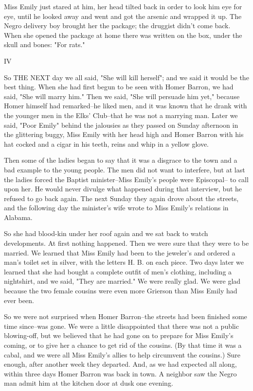 \documentclass[10pt,a4paper]{article}
\begin{document}
Miss Emily just stared at him, her head tilted back in order to look him eye for eye, until he looked away and went and got the arsenic and wrapped it up. The Negro delivery boy brought her the package; the druggist didn't come back. When she opened the package at home there was written on the box, under the skull and bones: "For rats."

IV

So THE NEXT day we all said, "She will kill herself"; and we said it would be the best thing. When she had first begun to be seen with Homer Barron, we had said, "She will marry him." Then we said, "She will persuade him yet," because Homer himself had remarked--he liked men, and it was known that he drank with the younger men in the Elks' Club--that he was not a marrying man. Later we said, "Poor Emily" behind the jalousies as they passed on Sunday afternoon in the glittering buggy, Miss Emily with her head high and Homer Barron with his hat cocked and a cigar in his teeth, reins and whip in a yellow glove.

Then some of the ladies began to say that it was a disgrace to the town and a bad example to the young people. The men did not want to interfere, but at last the ladies forced the Baptist minister--Miss Emily's people were Episcopal-- to call upon her. He would never divulge what happened during that interview, but he refused to go back again. The next Sunday they again drove about the streets, and the following day the minister's wife wrote to Miss Emily's relations in Alabama.

So she had blood-kin under her roof again and we sat back to watch developments. At first nothing happened. Then we were sure that they were to be married. We learned that Miss Emily had been to the jeweler's and ordered a man's toilet set in silver, with the letters H. B. on each piece. Two days later we learned that she had bought a complete outfit of men's clothing, including a nightshirt, and we said, "They are married." We were really glad. We were glad because the two female cousins were even more Grierson than Miss Emily had ever been.

So we were not surprised when Homer Barron--the streets had been finished some time since--was gone. We were a little disappointed that there was not a public blowing-off, but we believed that he had gone on to prepare for Miss Emily's coming, or to give her a chance to get rid of the cousins. (By that time it was a cabal, and we were all Miss Emily's allies to help circumvent the cousins.) Sure enough, after another week they departed. And, as we had expected all along, within three days Homer Barron was back in town. A neighbor saw the Negro man admit him at the kitchen door at dusk one evening.
\end{document}
